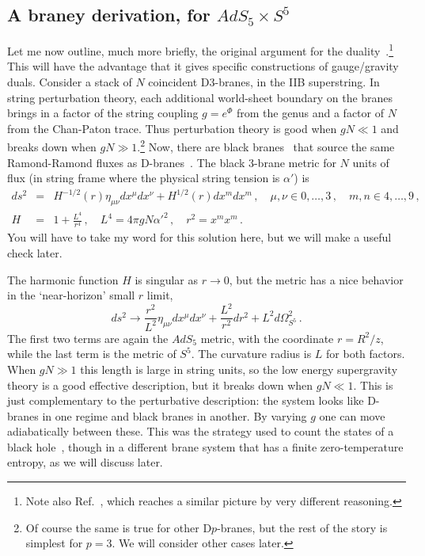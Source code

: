 \documentclass[12pt]{article}
\begin{document}
\subsection{A braney derivation, for $AdS_5 \times S^5$}

Let me now outline, much more briefly, the original argument for the duality~\cite{Maldacena:1997re}.\footnote{Note also Ref.~\cite{Polyakov:1997tj}, which reaches a similar picture by very different reasoning.}  This will have the advantage that it gives specific constructions of gauge/gravity duals.  Consider a stack of $N$ coincident D3-branes, in the IIB superstring.  In string perturbation theory, each additional world-sheet boundary on the branes brings in a factor of  the string coupling $g = e^{\Phi}$ from the genus and a factor of $N$ from the Chan-Paton trace.  Thus perturbation theory is good when $gN\ll 1$ and breaks down when $gN \gg 1$.\footnote{Of course the same is true for other D$p$-branes, but the rest of the story is simplest for $p = 3$.  We will consider other cases later.}  Now, there are black branes~\cite{Horowitz:1991cd} that source the same Ramond-Ramond fluxes as D-branes~\cite{Polchinski:1995mt}.  The black 3-brane metric for $N$ units of flux (in string frame where the physical string tension is $\alpha'$) is
\begin{eqnarray}
ds^2 &=& H^{-1/2}(r) \eta_{\mu\nu} dx^\mu dx^\nu + H^{1/2}(r) dx^m dx^m \, ,\quad
\mu,\nu \in 0,\ldots,3\,,\quad m,n \in 4,\ldots,9 \,,
 \nonumber\\
H &=& 1 + \frac{L^4}{r^4} \,,\quad L^4 = 4\pi g N \alpha'^2 \,,\quad r^2 = x^m x^m \,.
\label{black}
\end{eqnarray}
You will have to take my word for this solution here, but we will make a useful check later.

The harmonic function $H$ is singular as $r \to 0$, but the metric has a nice behavior in the `near-horizon' small $r$ limit,
\begin{equation}
ds^2 \to \frac{r^2}{L^2} \eta_{\mu\nu} dx^\mu dx^\nu + \frac{L^2}{r^2} dr^2 + L^2 d\Omega^2_{S^5}
\,. \label{ads5s5met}
\end{equation}
The first two terms are again the $AdS_5$ metric, with the coordinate $r = R^2/z$, while the last term is the metric of $S^5$.  The curvature radius is $L$ for both factors.  When $gN \gg 1$ this length is large in string units, so the low energy supergravity theory is a good effective description, but it breaks down when $gN \ll 1$.  This is just complementary to the perturbative description: the system looks like D-branes in one regime and black branes in another.  By varying $g$ one can move adiabatically between these.  This was the strategy used to count the states of a black hole~\cite{Strominger:1996sh}, though in a different brane system that has a finite zero-temperature entropy, as we will discuss later.
\end{document}

